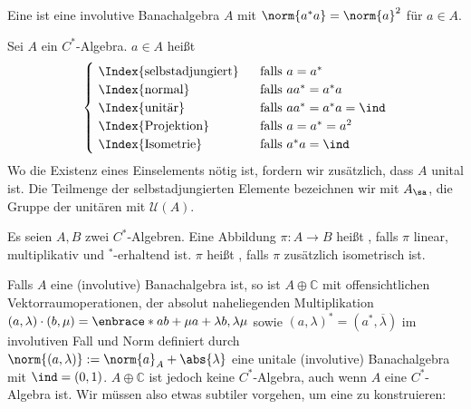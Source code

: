 \begin{definition}[{name=[$C^*$-Algebra]},label=def:22]
	Eine  ist eine involutive Banachalgebra $A$ mit $\norm{a^*a}= \norm{a}^2$ für $a \in A$.
\end{definition}

\begin{definition}[{name=[{selbstadjungiert, normal, unitär, Projektion, Isometrie}]}]
	Sei $A$ ein $C^*$-Algebra. $a \in A$ heißt 
	\[
		\begin{cases}
			\text{ \Index{selbstadjungiert} }  &\text{ falls } a=a^*\\
			\text{ \Index{normal} }  &\text{ falls }  aa^*=a^*a \\
			\text{ \Index{unitär} }  &\text{ falls }  aa^*=a^*a=\ind \\
			\text{ \Index{Projektion} }  &\text{ falls }   a=a^*=a^2 \\
			\text{ \Index{Isometrie} }  &\text{ falls } a^*a= \ind  
		\end{cases}
	\]
	Wo die Existenz eines Einselements nötig ist, fordern wir zusätzlich, dass $A$ unital ist.
	Die Teilmenge der selbstadjungierten Elemente bezeichnen wir mit $A_\sa$, die Gruppe der unitären mit $\mathcal{U}(A)$.
\end{definition}

\begin{definition}[{name=[${ }^*$-Homomorphismus]}]
	Es seien $A,B$ zwei $C^*$-Algebren. Eine Abbildung $\pi \colon A \to B$ heißt , falls $\pi$ 
	linear, multiplikativ und ${}^*$-erhaltend ist. $\pi$ heißt
	, falls $\pi$ zusätzlich isometrisch ist. 
\end{definition}

\begin{bemerkung}[{name=[Direkte Summe von $A$ mit den komplexen Zahlen]}]
	Falls $A$ eine (involutive) Banachalgebra ist, so ist $A \oplus \mathbb{C}$ mit offensichtlichen Vektorraumoperationen, der absolut naheliegenden Multiplikation $(a,\lambda) \cdot (b,\mu) = \enbrace*{ab + \mu a + \lambda b, \lambda \mu}$ sowie $(a,\lambda)^* = (a^*,\overline{\lambda})$ im involutiven Fall und Norm definiert durch
	$\norm{(a,\lambda)}:= \norm{a}_{A} + \abs{\lambda}$ eine unitale (involutive) Banachalgebra mit $\ind=(0,1)$. 
	$A \oplus \mathbb{C}$ ist jedoch keine $C^*$-Algebra, auch wenn $A$ eine $C^*$-Algebra ist.
	Wir müssen also etwas subtiler vorgehen, um eine  zu konstruieren:  
\end{bemerkung}

